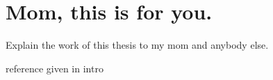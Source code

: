 \chapter{Mom, this is for you.\label{ch:mom}}

Explain the work of this thesis to my mom and anybody else.

reference given in intro
